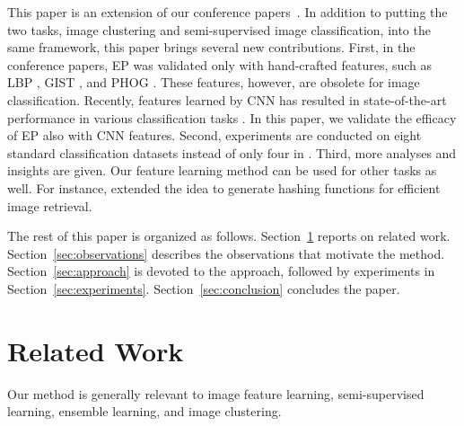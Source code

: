 \documentclass[preprint,12pt,3p]{elsarticle}
\begin{document}
This paper is an extension of our conference papers~\citep{dai:eccv12b,dai:iccv13b}. 
In addition to putting the two tasks, image clustering and semi-supervised image classification, 
into the same framework, this paper brings several new
contributions. First, in the conference papers, EP
was validated only with hand-crafted features, such as LBP
\citep{Ojala02}, GIST \citep{gist}, and PHOG
\citep{Bosch:iccv07}. These features, however, are obsolete for image classification. 
Recently, features learned by CNN has resulted in
state-of-the-art performance in various classification tasks
\citep{nips12:cnn, caffe14, rich:feature:cvpr14, deep:bmvc14}. In this
paper, we validate the efficacy of EP also with CNN features. Second, experiments are 
conducted on eight standard classification
datasets instead of only four in \citep{dai:iccv13b}. Third, 
more analyses and insights are given. 
Our feature learning method can be used for other tasks as well. For instance, 
\citep{random:hashing} extended the idea to generate hashing functions
for efficient image retrieval.


The rest of this paper is organized as follows. Section~\ref{sec:related}
reports on related work. Section~\ref{sec:observations} describes the
observations that motivate the method. Section~\ref{sec:approach} is devoted to the approach, followed by experiments in
Section~\ref{sec:experiments}. Section~\ref{sec:conclusion} concludes the
paper.


\section{Related Work}
\label{sec:related}
Our method is generally relevant to image feature learning, semi-supervised
learning, ensemble learning, and image clustering.
\end{document}
